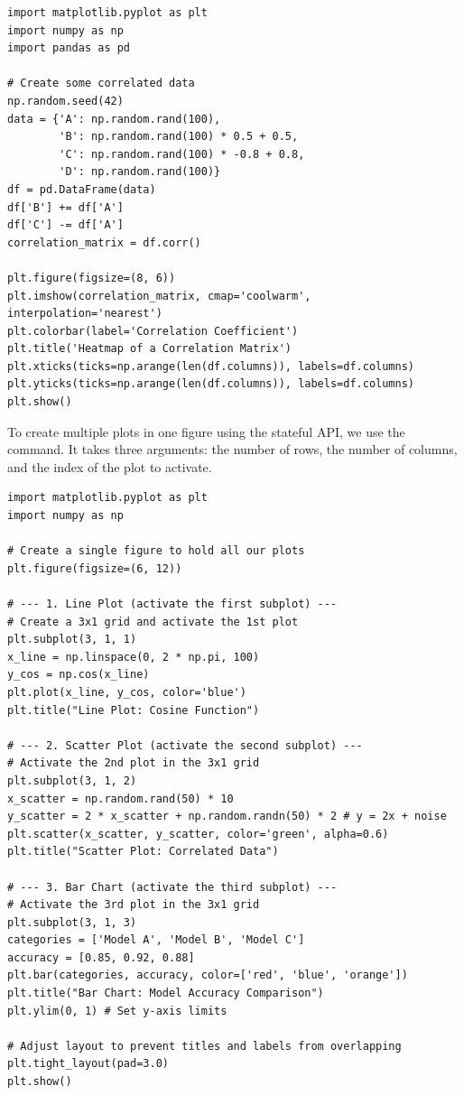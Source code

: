 \begin{example}
\text{ }\begin{verbatim}
import matplotlib.pyplot as plt
import numpy as np
import pandas as pd

# Create some correlated data
np.random.seed(42)
data = {'A': np.random.rand(100),
        'B': np.random.rand(100) * 0.5 + 0.5,
        'C': np.random.rand(100) * -0.8 + 0.8,
        'D': np.random.rand(100)}
df = pd.DataFrame(data)
df['B'] += df['A']
df['C'] -= df['A']
correlation_matrix = df.corr()

plt.figure(figsize=(8, 6))
plt.imshow(correlation_matrix, cmap='coolwarm', interpolation='nearest')
plt.colorbar(label='Correlation Coefficient')
plt.title('Heatmap of a Correlation Matrix')
plt.xticks(ticks=np.arange(len(df.columns)), labels=df.columns)
plt.yticks(ticks=np.arange(len(df.columns)), labels=df.columns)
plt.show()
\end{verbatim}
\end{example}

\begin{example}
To create multiple plots in one figure using the stateful API, we use the  command. It takes three arguments: the number of rows, the number of columns, and the index of the plot to activate.
\text{ }\begin{verbatim}
import matplotlib.pyplot as plt
import numpy as np

# Create a single figure to hold all our plots
plt.figure(figsize=(6, 12))

# --- 1. Line Plot (activate the first subplot) ---
# Create a 3x1 grid and activate the 1st plot
plt.subplot(3, 1, 1)
x_line = np.linspace(0, 2 * np.pi, 100)
y_cos = np.cos(x_line)
plt.plot(x_line, y_cos, color='blue')
plt.title("Line Plot: Cosine Function")

# --- 2. Scatter Plot (activate the second subplot) ---
# Activate the 2nd plot in the 3x1 grid
plt.subplot(3, 1, 2)
x_scatter = np.random.rand(50) * 10
y_scatter = 2 * x_scatter + np.random.randn(50) * 2 # y = 2x + noise
plt.scatter(x_scatter, y_scatter, color='green', alpha=0.6)
plt.title("Scatter Plot: Correlated Data")

# --- 3. Bar Chart (activate the third subplot) ---
# Activate the 3rd plot in the 3x1 grid
plt.subplot(3, 1, 3)
categories = ['Model A', 'Model B', 'Model C']
accuracy = [0.85, 0.92, 0.88]
plt.bar(categories, accuracy, color=['red', 'blue', 'orange'])
plt.title("Bar Chart: Model Accuracy Comparison")
plt.ylim(0, 1) # Set y-axis limits

# Adjust layout to prevent titles and labels from overlapping
plt.tight_layout(pad=3.0)
plt.show()
\end{verbatim}
\end{example}

